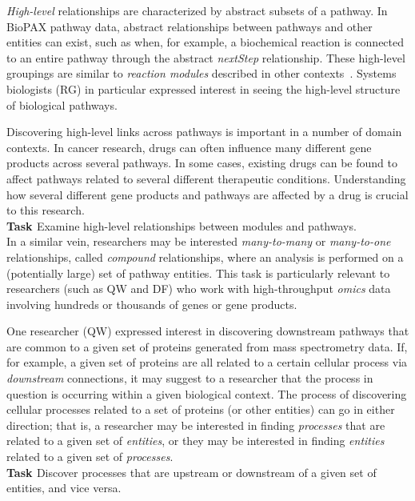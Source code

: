 \documentclass[review,journal]{vgtc}         %
\newcounter{task}
\newcommand*{\tasklabel}[1]{\refstepcounter{task}\thetask\label{#1}}
\begin{document}
\emph{High-level} relationships are characterized by abstract subsets of a pathway. In BioPAX pathway data, abstract relationships between pathways and other entities can exist, such as when, for example, a biochemical reaction is connected to an entire pathway through the abstract \emph{nextStep} relationship. These high-level groupings are similar to \emph{reaction modules} described in other contexts~\cite{Barba2013modules}. Systems biologists (RG) in particular expressed interest in seeing the high-level structure of biological pathways.

Discovering high-level links across pathways is important in a number of domain contexts. In cancer research, drugs can often influence many different gene products across several pathways. In some cases, existing drugs can be found to affect pathways related to several different therapeutic conditions. Understanding how several different gene products and pathways are affected by a drug is crucial to this research.
\ \\

\textbf{Task \tasklabel{task:highLevel}} Examine high-level relationships between modules and pathways.
\ \\

In a similar vein, researchers may be interested \emph{many-to-many} or \emph{many-to-one} relationships, called \emph{compound} relationships, where an analysis is performed on a (potentially large) set of pathway entities. This task is particularly relevant to researchers (such as QW and DF) who work with high-throughput \emph{omics} data involving hundreds or thousands of genes or gene products. 

One researcher (QW) expressed interest in discovering downstream pathways that are common to a given set of proteins generated from mass spectrometry data. If, for example, a given set of proteins are all related to a certain cellular process via \emph{downstream} connections, it may suggest to a researcher that the process in question is occurring within a given biological context. The process of discovering cellular processes related to a set of proteins (or other entities) can go in either direction; that is, a researcher may be interested in finding \emph{processes} that are related to a given set of \emph{entities}, or they may be interested in finding \emph{entities} related to a given set of \emph{processes}.
\ \\

\textbf{Task \tasklabel{task:upstreamDownstreamProcesses}} Discover processes that are upstream or downstream of a given set of entities, and vice versa.
\ \\
\end{document}

